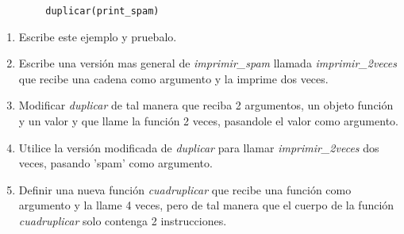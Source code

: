 \documentclass[10pt, twocolumn]{article}
\begin{document}
\begin{enumerate}
\begin{verbatim}
		duplicar(print_spam)
	\end{verbatim}
\begin{enumerate}
	\item Escribe este ejemplo y pruebalo.
	\item Escribe una versión mas general de \emph{imprimir\_spam} llamada \emph{imprimir\_2veces} que recibe una cadena como argumento y la imprime dos veces.
	\item Modificar \emph{duplicar} de tal manera que reciba 2 argumentos, un objeto función y un valor y que llame la función 2 veces, pasandole el valor como argumento.
	\item Utilice la versión modificada de \emph{duplicar} para llamar \emph{imprimir\_2veces} dos veces, pasando 'spam' como argumento.
	\item Definir una nueva función \emph{cuadruplicar} que recibe una función como argumento y la llame 4 veces, pero de tal manera que el cuerpo de la función \emph{cuadruplicar} solo contenga 2 instrucciones.
\end{enumerate}

\end{enumerate}
\end{document}
